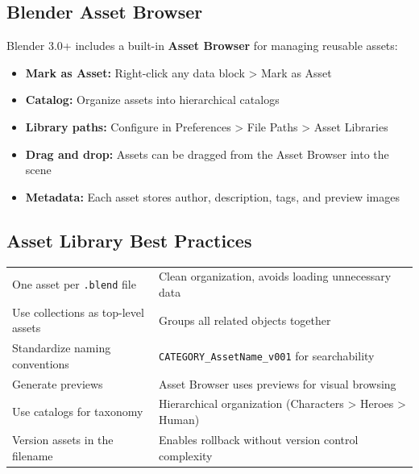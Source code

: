\subsection{Blender Asset Browser}

Blender 3.0+ includes a built-in \textbf{Asset Browser} for managing reusable assets:

\begin{itemize}[leftmargin=2em]
  \item \textbf{Mark as Asset:} Right-click any data block > Mark as Asset
  \item \textbf{Catalog:} Organize assets into hierarchical catalogs
  \item \textbf{Library paths:} Configure in Preferences > File Paths > Asset Libraries
  \item \textbf{Drag and drop:} Assets can be dragged from the Asset Browser into the scene
  \item \textbf{Metadata:} Each asset stores author, description, tags, and preview images
\end{itemize}

\subsection{Asset Library Best Practices}

\begin{center}
\begin{tabularx}{\textwidth}{L{4.5cm}X}
\toprule
{}
 &  \\
\midrule
One asset per \texttt{.blend} file & Clean organization, avoids loading unnecessary data \\
Use collections as top-level assets & Groups all related objects together \\
Standardize naming conventions & \texttt{CATEGORY\_AssetName\_v001} for searchability \\
Generate previews & Asset Browser uses previews for visual browsing \\
Use catalogs for taxonomy & Hierarchical organization (Characters > Heroes > Human) \\
Version assets in the filename & Enables rollback without version control complexity \\
\bottomrule
\end{tabularx}
\end{center}


